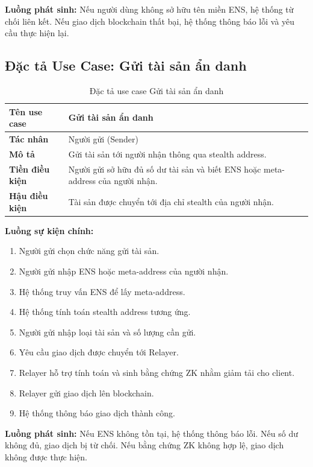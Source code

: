 \documentclass[../DoAn.tex]{subfiles}
\begin{document}
\textbf{Luồng phát sinh:} Nếu người dùng không sở hữu tên miền ENS, hệ thống từ chối liên kết. Nếu giao dịch blockchain thất bại, hệ thống thông báo lỗi và yêu cầu thực hiện lại.


\subsection{Đặc tả Use Case: Gửi tài sản ẩn danh}

\begin{table}[H]
\centering
\caption{Đặc tả use case Gửi tài sản ẩn danh}
\begin{tabular}{|p{4cm}|p{10cm}|}
\hline
\textbf{Tên use case} & Gửi tài sản ẩn danh \\ \hline
\textbf{Tác nhân} & Người gửi (Sender) \\ \hline
\textbf{Mô tả} & Gửi tài sản tới người nhận thông qua stealth address. \\ \hline
\textbf{Tiền điều kiện} & Người gửi sở hữu đủ số dư tài sản và biết ENS hoặc meta-address của người nhận. \\ \hline
\textbf{Hậu điều kiện} & Tài sản được chuyển tới địa chỉ stealth của người nhận. \\ \hline
\end{tabular}
\end{table}

\textbf{Luồng sự kiện chính:}

\begin{enumerate}
    \item Người gửi chọn chức năng gửi tài sản.
    \item Người gửi nhập ENS hoặc meta-address của người nhận.
    \item Hệ thống truy vấn ENS để lấy meta-address.
    \item Hệ thống tính toán stealth address tương ứng.
    \item Người gửi nhập loại tài sản và số lượng cần gửi.
    \item Yêu cầu giao dịch được chuyển tới Relayer.
    \item Relayer hỗ trợ tính toán và sinh bằng chứng ZK nhằm giảm tải cho client.
    \item Relayer gửi giao dịch lên blockchain.
    \item Hệ thống thông báo giao dịch thành công.
\end{enumerate}

\textbf{Luồng phát sinh:} Nếu ENS không tồn tại, hệ thống thông báo lỗi. Nếu số dư không đủ, giao dịch bị từ chối. Nếu bằng chứng ZK không hợp lệ, giao dịch không được thực hiện.
\end{document}
